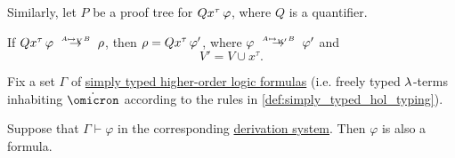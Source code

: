 \begin{proposition}
\begin{thmenum}
     Similarly, let \( P \) be a proof tree for \( \quantifier Q {x^\tau} \varphi \), where \( Q \) is a quantifier.

    If \( \quantifier Q {x^\tau} \varphi \redrel{A \mapsto_V B} \rho \), then \( \rho = \quantifier Q {x^\tau} \varphi' \), where \( \varphi \redrel{A \mapsto_{V'} B} \varphi' \) and
    \begin{equation*}
      V' = V \cup {x^\tau}.
    \end{equation*}
  \end{thmenum}
\end{proposition}

\begin{proposition}\label{thm:simply_typed_hol_proof_produce_formulas}
  Fix a set \( \Gamma \) of \hyperref[def:simply_typed_hol_formula]{simply typed higher-order logic formulas} (i.e. freely typed \( {\mathrm \lambda} \)-terms inhabiting \( \syn\omicron \) according to the rules in \cref{def:simply_typed_hol_typing}).

  Suppose that \( \Gamma \vdash \varphi \) in the corresponding \hyperref[def:simply_typed_hol_proof_tree]{derivation system}. Then \( \varphi \) is also a formula.
\end{proposition}
